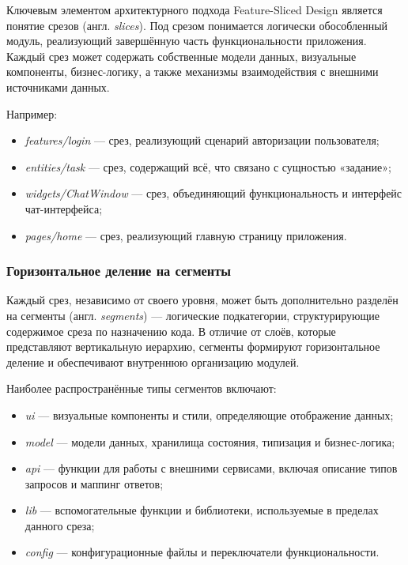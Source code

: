 Ключевым элементом архитектурного подхода Feature-Sliced Design является понятие срезов (англ. \textit{slices}). Под срезом понимается логически обособленный модуль, реализующий завершённую часть функциональности приложения. Каждый срез может содержать собственные модели данных, визуальные компоненты, бизнес-логику, а также механизмы взаимодействия с внешними источниками данных.

Например:
\begin{itemize}
  \item \textit{features/login} — срез, реализующий сценарий авторизации пользователя;
  \item \textit{entities/task} — срез, содержащий всё, что связано с сущностью «задание»;
  \item \textit{widgets/ChatWindow} — срез, объединяющий функциональность и интерфейс чат-интерфейса;
  \item \textit{pages/home} — срез, реализующий главную страницу приложения.
\end{itemize}

\subsubsection{Горизонтальное деление на сегменты}

Каждый срез, независимо от своего уровня, может быть дополнительно разделён на сегменты (англ. \textit{segments}) — логические подкатегории, структурирующие содержимое среза по назначению кода. В отличие от слоёв, которые представляют вертикальную иерархию, сегменты формируют горизонтальное деление и обеспечивают внутреннюю организацию модулей.

Наиболее распространённые типы сегментов включают:
\begin{itemize}
  \item \textit{ui} — визуальные компоненты и стили, определяющие отображение данных;
  \item \textit{model} — модели данных, хранилища состояния, типизация и бизнес-логика;
  \item \textit{api} — функции для работы с внешними сервисами, включая описание типов запросов и маппинг ответов;
  \item \textit{lib} — вспомогательные функции и библиотеки, используемые в пределах данного среза;
  \item \textit{config} — конфигурационные файлы и переключатели функциональности.
\end{itemize}

